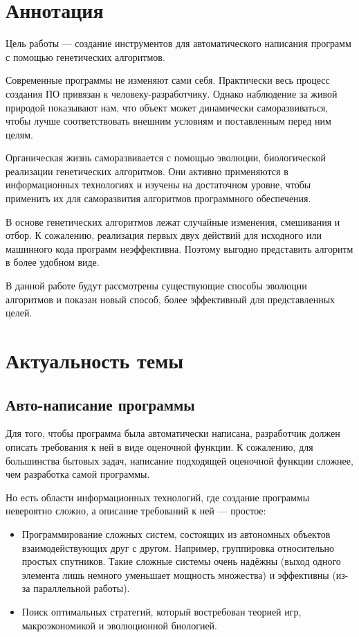 \documentclass[a4paper,14pt]{extarticle}
\begin{document}
\section*{Аннотация}

Цель работы — создание инструментов для автоматического написания программ с
помощью генетических алгоритмов.

Современные программы не изменяют сами себя. Практически весь процесс создания
ПО привязан к человеку-разработчику. Однако наблюдение за живой природой
показывают нам, что объект может динамически саморазвиваться, чтобы лучше
соответствовать внешним условиям и поставленным перед ним целям.

Органическая жизнь саморазвивается с помощью эволюции, биологической реализации
генетических алгоритмов. Они активно применяются в информационных технологиях и
изучены на достаточном уровне, чтобы применить их для саморазвития алгоритмов
программного обеспечения.

В основе генетических алгоритмов лежат случайные изменения, смешивания и отбор.
К сожалению, реализация первых двух действий для исходного или машинного кода 
программ неэффективна. Поэтому выгодно представить алгоритм в более удобном
виде.

В данной работе будут рассмотрены существующие способы эволюции алгоритмов и
показан новый способ, более эффективный для представленных целей.

\newpage
\tableofcontents

\newpage
\section{Актуальность темы}

\subsection{Авто-написание программы}
Для того, чтобы программа была автоматически написана, разработчик должен
описать требования к ней в виде оценочной функции. К сожалению, для большинства
бытовых задач, написание подходящей оценочной функции сложнее, чем
разработка самой программы.

Но есть области информационных технологий, где создание программы невероятно
сложно, а описание требований к ней — простое:
\begin{itemize}
  \item Программирование сложных систем, состоящих из автономных объектов
        взаимодействующих друг с другом. Например, группировка относительно
        простых спутников. Такие сложные системы очень надёжны (выход одного
        элемента лишь немного уменьшает мощность множества) и эффективны (из-за
        параллельной работы).
  \item Поиск оптимальных стратегий, который востребован теорией игр,
        макроэкономикой и эволюционной биологией.
\end{itemize}
\end{document}
